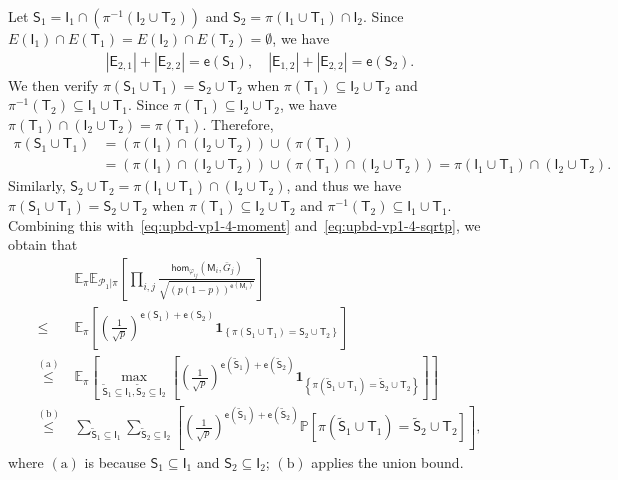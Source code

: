 \documentclass[letterpaper,11pt]{article}
\theoremstyle{definition}
\newcommand{\maP}{\mathcal{P}}
\newcommand{\prob}[1]{ \mathbb{P}\left[ #1 \right] }
\newcommand{\nbr}[1]{{\sf\color{red}[#1]}}
\newcommand{\en}{\mathsf{{e}}}
\newcommand{\pth}[1]{\left( #1 \right)}
\newcommand{\qth}[1]{\left[ #1 \right]}
\newcommand{\ti}{\tilde}
\newcommand{\sfE}{{\mathsf{E}}}
\newcommand{\sfI}{{\mathsf{I}}}
\newcommand{\sfM}{{\mathsf{M}}}
\newcommand{\sfS}{{\mathsf{S}}}
\newcommand{\sfT}{{\mathsf{T}}}
\newcommand{\indc}[1]{{\mathbf{1}_{\left\{{#1}\right\}}}}
\renewcommand{\hom}{\mathsf{hom}}
\newcommand{\vp}{\varphi}
\def\E{\mathbb{E}}
\begin{document}
Let $\sfS_1 = \sfI_1\cap \pth{\pi^{-1}(\sfI_2\cup \sfT_2)}$ and $\sfS_2 = \pi(\sfI_1\cup \sfT_1) \cap \sfI_2$. Since $E(\sfI_1)\cap E(\sfT_1)=E(\sfI_2)\cap E(\sfT_2) = \emptyset$, we have \begin{align*}
    |\sfE_{2,1}|+ |\sfE_{2,2}| = \en(\sfS_1),\quad |\sfE_{1,2}|+|\sfE_{2,2}| = \en(\sfS_2).
\end{align*}
We then verify $\pi(\sfS_1\cup \sfT_1) = \sfS_2\cup\sfT_2$ when $\pi(\sfT_1)\subseteq \sfI_2\cup \sfT_2$ and $\pi^{-1}(\sfT_2)\subseteq \sfI_1\cup \sfT_1$. Since $\pi(\sfT_1)\subseteq \sfI_2\cup \sfT_2$, we have $\pi(\sfT_1)\cap  (\sfI_2\cup \sfT_2 )= \pi(\sfT_1)$.%
Therefore, \begin{align*}
    \pi(\sfS_1\cup \sfT_1) &= \pth{\pi(\sfI_1)\cap (\sfI_2\cup\sfT_2)} \cup (\pi(\sfT_1))\\ &= \pth{\pi(\sfI_1)\cap (\sfI_2\cup\sfT_2)}\cup \pth{\pi(\sfT_1)\cap (\sfI_2\cup\sfT_2)}=\pi(\sfI_1\cup \sfT_1) \cap (\sfI_2\cup \sfT_2).
\end{align*}
Similarly, $\sfS_2\cup \sfT_2 = \pi(\sfI_1\cup \sfT_1) \cap (\sfI_2\cup \sfT_2)$, and thus we have $\pi(\sfS_1\cup \sfT_1)= \sfS_2\cup \sfT_2 $ when $\pi(\sfT_1)\subseteq \sfI_2\cup \sfT_2$ and $\pi^{-1}(\sfT_2)\subseteq \sfI_1\cup \sfT_1$. Combining this with~\eqref{eq:upbd-vp1-4-moment} and~\eqref{eq:upbd-vp1-4-sqrtp}, we obtain that \begin{align}
    \nonumber &~\E_\pi\E_{\maP_1|\pi}\qth{\prod_{i,j}\frac{\hom_{\vp_{ij}}(\sfM_i,\bar{G}_j)}{\sqrt{(p(1-p))^{\en(\sfM_i)}}}}\\\nonumber\le&~ \E_\pi\qth{\pth{\frac{1}{\sqrt{p}}}^{\en(\sfS_1)+\en(\sfS_2)}\indc{\pi(\sfS_1\cup\sfT_1) = \sfS_2\cup \sfT_2}}\\\nonumber
    \overset{\mathrm{(a)}}{\le}&~\E_\pi\qth{\max_{\ti{\sfS}_1\subseteq \sfI_1,\ti{\sfS}_2\subseteq \sfI_2}\qth{\pth{\frac{1}{\sqrt{p}}}^{\en(\ti{\sfS}_1)+\en(\ti{\sfS}_2)}\indc{\pi(\ti{\sfS}_1\cup\sfT_1) = \ti{\sfS}_2\cup \sfT_2} }}\\\label{eq:sum-prob-pi-p}
    \overset{\mathrm{(b)}}{\le}&~ \sum_{\ti{\sfS}_1\subseteq \sfI_1}\sum_{\ti{\sfS}_2\subseteq \sfI_2} \qth{\pth{\frac{1}{\sqrt{p}}}^{\en(\ti{\sfS}_1)+\en(\ti{\sfS}_2)}\prob{\pi(\ti{\sfS}_1\cup\sfT_1) = \ti{\sfS}_2\cup \sfT_2} },
\end{align}
where $\mathrm{(a)}$ is because $\sfS_1\subseteq \sfI_1$ and $\sfS_2\subseteq \sfI_2$; $\mathrm{(b)}$ applies the union bound.
\end{document}
